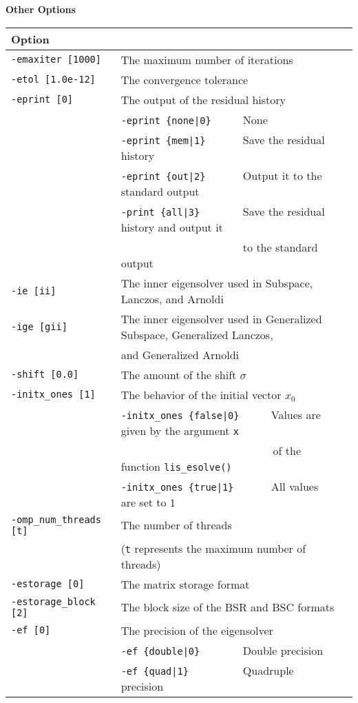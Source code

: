 \documentclass[a4paper]{article}
\begin{document}
\begin{minipage}[t]{\textwidth}
\begin{center}
{\bf Other Options}\\
\begin{tabular}{l|ll}\hline\hline
Option &                          \\ \hline
\verb=-emaxiter [1000]= & The maximum number of iterations         \\ 
\verb=-etol [1.0e-12]=  & The convergence tolerance                \\
\verb=-eprint [0]=      & The output of the residual history                \\
                       & \verb=-eprint {none|0}     =  None \\
                       & \verb=-eprint {mem|1}      =  Save the residual history\\
                       & \verb=-eprint {out|2}      =  Output it to the standard output\\
                       & \verb=-print {all|3}       =  Save the residual history and output it \\
                       & \verb=                     =  to the standard output \\
\verb=-ie [ii]= & The inner eigensolver used in Subspace, Lanczos, and Arnoldi\\
\verb=-ige [gii]= & The inner eigensolver used in Generalized Subspace, Generalized Lanczos, \\
                       & and Generalized Arnoldi\\
\verb=-shift [0.0]= & The amount of the shift $\sigma$ \\
\verb=-initx_ones [1]= & The behavior of the initial vector $x_{0}$  \\
                       & \verb=-initx_ones {false|0}     =  Values are given by the argument \verb=x= \\
                       & \verb=                           =  of the function \verb=lis_esolve()= \\
                       & \verb=-initx_ones {true|1}      =  All values are set to $1$ \\
\verb=-omp_num_threads [t]= & The number of threads        \\ 
                            & (\verb=t= represents the maximum number of
 threads) \\
\verb=-estorage [0]=   & The matrix storage format \\
\verb=-estorage_block [2]=& The block size of the BSR and BSC formats\\ 
\verb=-ef [0]=         & The precision of the eigensolver\\
                       & \verb=-ef {double|0}       =  Double precision \\ 
                       & \verb=-ef {quad|1}         =  Quadruple precision \\
\hline         
\end{tabular}
\end{center}
\end{minipage}
\end{document}
